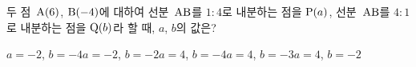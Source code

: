 두 점~$\mathrm{A}(6)$, $\mathrm{B}(-4)$에 대하여 선분~$\mathrm{AB}$를 $1:4$로 내분하는 점을 $\mathrm{P}(a)$, 선분~$\mathrm{AB}$를 $4:1$로 내분하는 점을 $\mathrm{Q}(b)$라 할 때, $a$, $b$의 값은?
\begin{choicesii}{$a=-2$, $b=-4$}{$a=-2$, $b=-2$}{$a=4$, $b=-4$}{$a=4$, $b=-3$}{$a=4$, $b=-2$}\end{choicesii}
